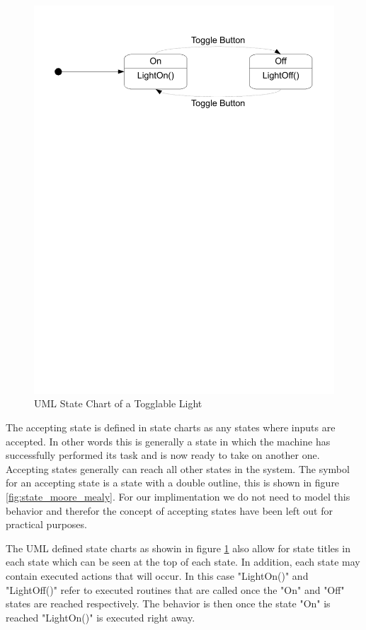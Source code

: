 \begin{figure}[htp]
    \centering
    \includegraphics[trim= 15mm 200mm 15mm 10mm, clip ,width=\imgmedium]{./images/state_uml_light.pdf} 
    \caption{UML State Chart of a Togglable Light}
    \label{fig:state_uml_light}
\end{figure}

The accepting state is defined in state charts as any states where inputs are accepted. In other words this is generally a state in which the machine has successfully performed its task and is now ready to take on another one. Accepting states generally can reach all other states in the system. The symbol for an accepting state is a state with a double outline, this is shown in figure \ref{fig:state_moore_mealy}. For our implimentation we do not need to model this behavior and therefor the concept of accepting states have been left out for practical purposes.

The UML defined state charts as showin in figure \ref{fig:state_uml_light} also allow for state titles in each state which can be seen at the top of each state. In addition, each state may contain executed actions that will occur. In this case "LightOn()" and "LightOff()" refer to executed routines that are called once the "On" and "Off" states are reached respectively. The behavior is then once the state "On" is reached "LightOn()" is executed right away.

